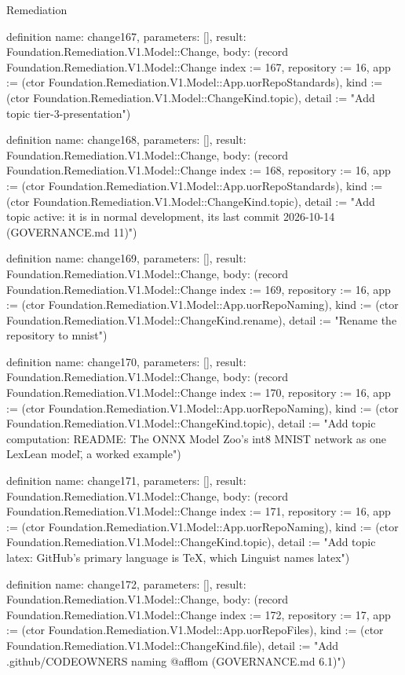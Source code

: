 \begin{lexlean}{Remediation}
\begin{semanticmodule}
definition{
  name: change167,
  parameters: [],
  result: Foundation.Remediation.V1.Model::Change,
  body: (record Foundation.Remediation.V1.Model::Change {index := 167, repository := 16, app := (ctor Foundation.Remediation.V1.Model::App.uorRepoStandards), kind := (ctor Foundation.Remediation.V1.Model::ChangeKind.topic), detail := "Add topic tier-3-presentation"})
}

definition{
  name: change168,
  parameters: [],
  result: Foundation.Remediation.V1.Model::Change,
  body: (record Foundation.Remediation.V1.Model::Change {index := 168, repository := 16, app := (ctor Foundation.Remediation.V1.Model::App.uorRepoStandards), kind := (ctor Foundation.Remediation.V1.Model::ChangeKind.topic), detail := "Add topic active: it is in normal development, its last commit 2026-10-14 (GOVERNANCE.md 11)"})
}

definition{
  name: change169,
  parameters: [],
  result: Foundation.Remediation.V1.Model::Change,
  body: (record Foundation.Remediation.V1.Model::Change {index := 169, repository := 16, app := (ctor Foundation.Remediation.V1.Model::App.uorRepoNaming), kind := (ctor Foundation.Remediation.V1.Model::ChangeKind.rename), detail := "Rename the repository to mnist"})
}

definition{
  name: change170,
  parameters: [],
  result: Foundation.Remediation.V1.Model::Change,
  body: (record Foundation.Remediation.V1.Model::Change {index := 170, repository := 16, app := (ctor Foundation.Remediation.V1.Model::App.uorRepoNaming), kind := (ctor Foundation.Remediation.V1.Model::ChangeKind.topic), detail := "Add topic computation: README: \"The ONNX Model Zoo's int8 MNIST network as one LexLean model\", a worked example"})
}

definition{
  name: change171,
  parameters: [],
  result: Foundation.Remediation.V1.Model::Change,
  body: (record Foundation.Remediation.V1.Model::Change {index := 171, repository := 16, app := (ctor Foundation.Remediation.V1.Model::App.uorRepoNaming), kind := (ctor Foundation.Remediation.V1.Model::ChangeKind.topic), detail := "Add topic latex: GitHub's primary language is TeX, which Linguist names latex"})
}

definition{
  name: change172,
  parameters: [],
  result: Foundation.Remediation.V1.Model::Change,
  body: (record Foundation.Remediation.V1.Model::Change {index := 172, repository := 17, app := (ctor Foundation.Remediation.V1.Model::App.uorRepoFiles), kind := (ctor Foundation.Remediation.V1.Model::ChangeKind.file), detail := "Add .github/CODEOWNERS naming @afflom (GOVERNANCE.md 6.1)"})
}


\end{semanticmodule}
\end{lexlean}
